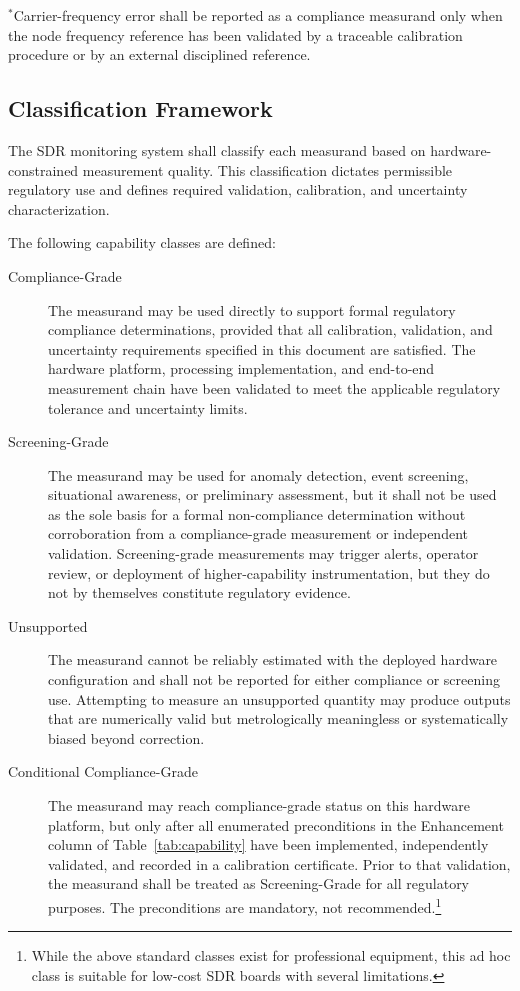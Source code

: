 \documentclass[11pt]{article}
\begin{document}
\vspace{-0.8\baselineskip}
\noindent\small $^*$Carrier-frequency error shall be reported as a compliance measurand only when the node frequency reference has been validated by a traceable calibration procedure or by an external disciplined reference.

\subsection*{Classification Framework}

The SDR monitoring system shall classify each measurand based on hardware-constrained measurement quality. This classification dictates permissible regulatory use and defines required validation, calibration, and uncertainty characterization.

The following capability classes are defined:

\begin{description}

\item[Compliance-Grade] The measurand may be used directly to support formal regulatory compliance determinations, provided that all calibration, validation, and uncertainty requirements specified in this document are satisfied. The hardware platform, processing implementation, and end-to-end measurement chain have been validated to meet the applicable regulatory tolerance and uncertainty limits.

\item[Screening-Grade] The measurand may be used for anomaly detection, event screening, situational awareness, or preliminary assessment, but it shall not be used as the sole basis for a formal non-compliance determination without corroboration from a compliance-grade measurement or independent validation. Screening-grade measurements may trigger alerts, operator review, or deployment of higher-capability instrumentation, but they do not by themselves constitute regulatory evidence.

\item[Unsupported] The measurand cannot be reliably estimated with the deployed hardware configuration and shall not be reported for either compliance or screening use. Attempting to measure an unsupported quantity may produce outputs that are numerically valid but metrologically meaningless or systematically biased beyond correction.

\item[Conditional Compliance-Grade] The measurand may reach compliance-grade status on this hardware platform, but only after all enumerated preconditions in the Enhancement column of Table~\ref{tab:capability} have been implemented, independently validated, and recorded in a calibration certificate. Prior to that validation, the measurand shall be treated as Screening-Grade for all regulatory purposes. The preconditions are mandatory, not recommended.\footnote{While the above standard classes exist for professional equipment, this ad hoc class is suitable for low-cost SDR boards with several limitations.}

\end{description}
\end{document}
